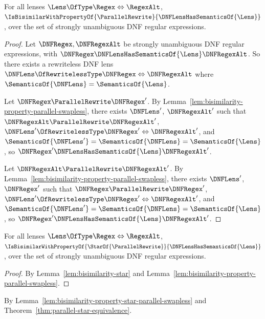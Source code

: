 \documentclass[acmsmall,screen]{acmart}
\begin{document}
\begin{mylemma}
  \label{lem:bisimilarity-property-parallel-swapless}
  For all lenses $\Lens \OfType \Regex \Leftrightarrow \RegexAlt$,
  $\IsBisimilarWithPropertyOf{\ParallelRewrite}{\DNFLensHasSemanticsOf{\Lens}}$,
  over the set of strongly unambiguous DNF regular expressions.
\end{mylemma}
\begin{proof}
  Let $\DNFRegex,\DNFRegexAlt$ be strongly unambiguous DNF regular expressions,
  with $\DNFRegex \DNFLensHasSemanticsOf{\Lens} \DNFRegexAlt$.
  So there exists a rewriteless DNF lens
  $\DNFLens \OfRewritelessType \DNFRegex \Leftrightarrow \DNFRegexAlt$ where
  $\SemanticsOf{\DNFLens} = \SemanticsOf{\Lens}$.

  Let $\DNFRegex \ParallelRewrite \DNFRegex'$.  By
  Lemma~\ref{lem:bisimilarity-property-parallel-swapless}, there exists $\DNFLens'$,
  $\DNFRegexAlt'$ such that $\DNFRegexAlt \ParallelRewrite \DNFRegexAlt'$,
  $\DNFLens' \OfRewritelessType \DNFRegex' \Leftrightarrow \DNFRegexAlt'$,
  and $\SemanticsOf{\DNFLens'} = \SemanticsOf{\DNFLens} = \SemanticsOf{\Lens}$,
  so $\DNFRegex' \DNFLensHasSemanticsOf{\Lens} \DNFRegexAlt'$.

  Let $\DNFRegexAlt \ParallelRewrite \DNFRegexAlt'$.  By
  Lemma~\ref{lem:bisimilarity-property-parallel-swapless}, there exists $\DNFLens'$,
  $\DNFRegex'$ such that $\DNFRegex \ParallelRewrite \DNFRegex'$,
  $\DNFLens' \OfRewritelessType \DNFRegex' \Leftrightarrow \DNFRegexAlt'$,
  and $\SemanticsOf{\DNFLens'} = \SemanticsOf{\DNFLens} = \SemanticsOf{\Lens}$,
  so $\DNFRegex' \DNFLensHasSemanticsOf{\Lens} \DNFRegexAlt'$.
\end{proof}

\begin{mylemma}
  \label{lem:bisimilarity-property-star-parallel-swapless}
  For all lenses $\Lens \OfType \Regex \Leftrightarrow \RegexAlt$,
  $\IsBisimilarWithPropertyOf{\StarOf{\ParallelRewrite}}{\DNFLensHasSemanticsOf{\Lens}}$,
  over the set of strongly unambiguous DNF regular expressions.
\end{mylemma}
\begin{proof}
  By Lemma~\ref{lem:bisimilarity-star} and
  Lemma~\ref{lem:bisimilarity-property-parallel-swapless}.
\end{proof}

\begin{corollary}
  \label{cor:bisimilarity-star-sequential}
  By Lemma~\ref{lem:bisimilarity-property-star-parallel-swapless} and
  Theorem~\ref{thm:parallel-star-equivalence}.
\end{corollary}
\end{document}
